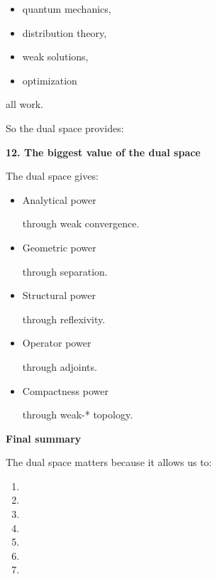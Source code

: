 \begin{description}
	\begin{itemize}
    \item quantum mechanics,
    \item distribution theory,
    \item weak solutions,
    \item optimization
	\end{itemize}

all work.

So the dual space provides:

\> 

\item \textbf{12. The biggest value of the dual space}

The dual space gives:

	\begin{itemize}
        \item Analytical power

through weak convergence.

        \item Geometric power

through separation.

        \item Structural power

through reflexivity.

        \item Operator power

through adjoints.

        \item Compactness power

through weak-* topology.

	\end{itemize}

\item \textbf{Final summary}

The dual space matters because it allows us to:

\begin{enumerate}
\item {}
\item {}
\item {}
\item {}
\item {}
\item {}
\item {}
\end{enumerate}


\end{description}
